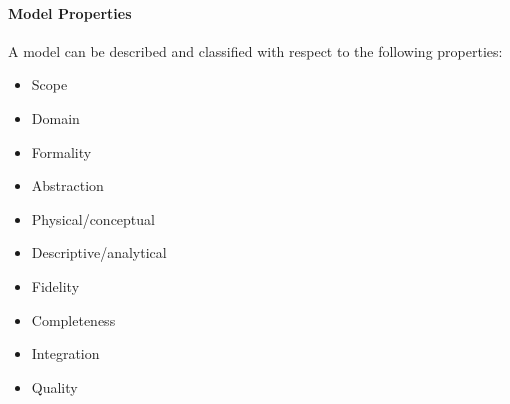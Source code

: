 \documentclass[letterpaper,10pt,english]{jupyterBook}
\begin{document}
\paragraph{Model Properties}
\label{\detokenize{SE/sebok:model-properties}}
\sphinxAtStartPar
A model can be described and classified with respect to the following properties:
\begin{itemize}
\item {} 
\sphinxAtStartPar
Scope

\item {} 
\sphinxAtStartPar
Domain

\item {} 
\sphinxAtStartPar
Formality

\item {} 
\sphinxAtStartPar
Abstraction

\item {} 
\sphinxAtStartPar
Physical/conceptual

\item {} 
\sphinxAtStartPar
Descriptive/analytical

\item {} 
\sphinxAtStartPar
Fidelity

\item {} 
\sphinxAtStartPar
Completeness

\item {} 
\sphinxAtStartPar
Integration

\item {} 
\sphinxAtStartPar
Quality

\end{itemize}
\end{document}
